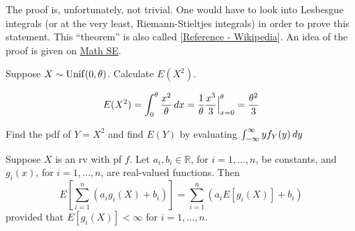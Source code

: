 \documentclass[notoc,notitlepage]{tufte-book}
\begin{document}
The proof is, unfortunately, not trivial. One would have to look into Lesbesgue integrals (or at the very least, Riemann-Stieltjes integrals) in order to prove this statement. This ``theorem'' is also called  [\href{https://en.wikipedia.org/wiki/Law_of_the_unconscious_statistician}{Reference - Wikipedia}]. An idea of the proof is given on \href{https://math.stackexchange.com/questions/1277800/expected-value-of-a-function-of-a-random-variable}{Math SE}.

\begin{eg}
  Suppose $X \sim \operatorname{Unif}(0, \theta)$. Calculate $E(X^2)$.

  \begin{solution}
    \begin{equation*}
      E(X^2) = \int_{0}^{\theta} \frac{x^2}{\theta} \mathop{}\!d{x} = \frac{1}{\theta} \frac{x^3}{3} \Big|_{x = 0}^{\theta} = \frac{\theta^2}{3}
    \end{equation*}
  \end{solution}
\end{eg}

\begin{ex}
  Find the pdf of $Y = X^2$ and find $E(Y)$ by evaluating $\int_{-\infty}^{\infty} y f_Y(y) \mathop{}\!d{y}$
\end{ex}

\begin{thm}
\label{thm:linearity_of_expectation}
  Suppose $X$ is an rv with pf $f$. Let $a_i, b_i \in \mathbb{R}$, for $i = 1, ..., n$, be constants, and $g_i (x)$, for $i = 1, ..., n$, are real-valued functions. Then
  \begin{equation}\label{eq:linearity_of_expectation}
    E \left[ \sum_{i = 1}^{n} \left( a_i g_i(X) + b_i \right) \right] = \sum_{i = 1}^{n} \left( a_i E[ g_i(X) ] + b_i \right)
  \end{equation}
  provided that $E[g_i(X)] < \infty$ for $i = 1, ..., n$.
\end{thm}
\end{document}
